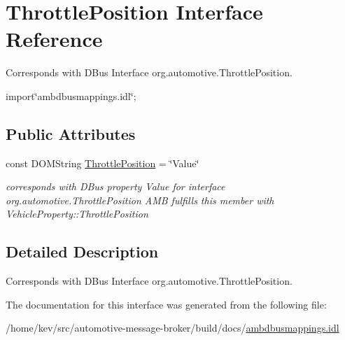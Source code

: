 \hypertarget{interfaceThrottlePosition}{\section{Throttle\+Position Interface Reference}
\label{interfaceThrottlePosition}
}


Corresponds with D\+Bus Interface org.\+automotive.\+Throttle\+Position.  




{\ttfamily import\char`\"{}ambdbusmappings.\+idl\char`\"{};}

\subsection*{Public Attributes}
\begin{DoxyCompactItemize}
\item 
\hypertarget{interfaceThrottlePosition_adcfc58d73205b590b5f3371e564aa96c}{const D\+O\+M\+String \hyperlink{interfaceThrottlePosition_adcfc58d73205b590b5f3371e564aa96c}{Throttle\+Position} = \char`\"{}Value\char`\"{}}\label{interfaceThrottlePosition_adcfc58d73205b590b5f3371e564aa96c}

\begin{DoxyCompactList}\small\item\em corresponds with D\+Bus property Value for interface org.\+automotive.\+Throttle\+Position A\+M\+B fulfills this member with Vehicle\+Property\+::\+Throttle\+Position \end{DoxyCompactList}\end{DoxyCompactItemize}


\subsection{Detailed Description}
Corresponds with D\+Bus Interface org.\+automotive.\+Throttle\+Position. 

The documentation for this interface was generated from the following file\+:\begin{DoxyCompactItemize}
\item 
/home/kev/src/automotive-\/message-\/broker/build/docs/\hyperlink{ambdbusmappings_8idl}{ambdbusmappings.\+idl}\end{DoxyCompactItemize}
